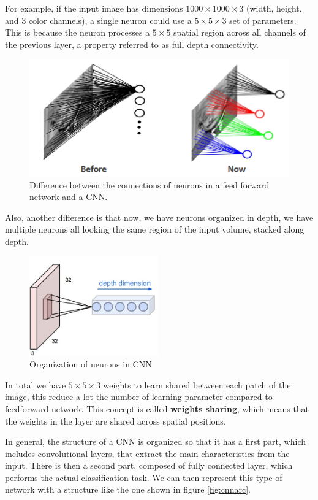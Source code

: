 For example, if the input image has dimensions $1000 \times 1000 \times 3$ (width,
height, and 3 color channels), a single neuron could use a $5 \times 5 \times 3$
set of parameters. This is because the neuron processes a $5 \times 5$ spatial
region across all channels of the previous layer, a property referred to as full
depth connectivity.

\begin{figure}[!ht]
    \centering
    \includegraphics[width=0.5\linewidth]{img/CNN/localConn.png}
    \caption{Difference between the connections of neurons in a feed forward
        network and a CNN.}
    \label{fig:localConn}
\end{figure}

Also, another difference is that now, we have neurons organized in depth, we have
multiple neurons all looking the same region of the input volume, stacked along depth.

\begin{figure}[!ht]
    \centering
    \includegraphics[width=0.25\linewidth]{img/CNN/depth.png}
    \caption{Organization of neurons in CNN}
    \label{fig:depth}
\end{figure}

In total we have $5\times 5\times 3$ weights to learn shared between each patch
of the image, this reduce a lot the number of learning parameter compared to
feedforward network. This concept is called \textbf{weights sharing}, which means
that the weights in the layer are shared across spatial positions.

In general, the structure of a CNN is organized so that it has a first part,
which includes convolutional layers, that extract the main characteristics from
the input. There is then a second part, composed of fully connected layer, which
performs the actual classification task. We can then represent this type of
network with a structure like the one shown in figure \ref{fig:cnnarc}.

